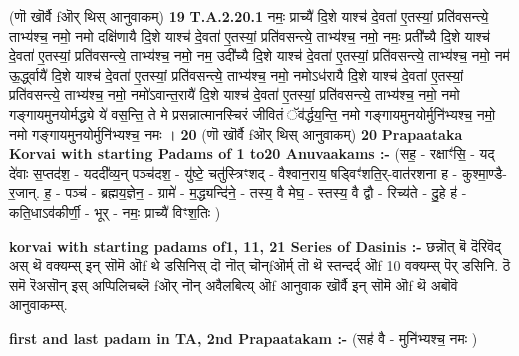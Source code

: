 \documentclass[17pt]{extarticle}
\begin{document}
                  \newline
                                                        (णॊ खॊर्वै fऒर् थिस् आनुवाकम्) \textbf{19} \newline \newline
                                \textbf{ T.A.2.20.1} \newline
                  नमः॒ प्राच्यै॑ दि॒शे याश्च॑ दे॒वता॑ ए॒तस्यां॒ प्रति॑वसन्त्ये॒ ताभ्य॑श्च॒ नमो॒ नमो दक्षि॑णायै दि॒शे याश्च॑ दे॒वता॑ ए॒तस्यां॒ प्रति॑वसन्त्ये॒ ताभ्य॑श्च॒ नमो॒ नमः॒ प्रती᳚च्यै दि॒शे याश्च॑ दे॒वता॑ ए॒तस्यां॒ प्रति॑वसन्त्ये॒ ताभ्य॑श्च॒ नमो॒ नम॒ उदी᳚च्यै दि॒शे याश्च॑ दे॒वता॑ ए॒तस्यां॒ प्रति॑वसन्त्ये॒ ताभ्य॑श्च॒ नमो॒ नम॑ ऊ॒र्द्ध्वायै॑ दि॒शे याश्च॑ दे॒वता॑ ए॒तस्यां॒ प्रति॑वसन्त्ये॒ ताभ्य॑श्च॒ नमो॒ नमोऽध॑रायै दि॒शे याश्च॑ दे॒वता॑ ए॒तस्यां॒ प्रति॑वसन्त्ये॒ ताभ्य॑श्च॒ नमो॒ नमो॑ऽवान्त॒रायै॑ दि॒शे याश्च॑ दे॒वता॑ ए॒तस्यां॒ प्रति॑वसन्त्ये॒ ताभ्य॑श्च॒ नमो॒ नमो गङ्गायमुनयोर्मद्ध्ये ये॑ वस॒न्ति॒ ते मे प्रसन्नात्मानस्चिरं जीवितं ॅव॑र्द्धय॒न्ति॒ नमो गङ्गायमुनयोर्मुनि॑भ्यश्च॒ नमो॒ नमो गङ्गायमुनयोर्मुनि॑भ्यश्च॒ नमः । \textbf{ 20} \newline
                  \newline
                                                        (णॊ खॊर्वै fऒर् थिस् आनुवाकम्) \textbf{20} \newline \newline
\textbf{Prapaataka Korvai with starting Padams of 1 to20 Anuvaakams :-} \newline
(सह॒ - रक्षाꣳ॑सि॒ - यद् दे॑वाः स॒प्तद॑श॒ - यददी᳚व्य॒न् पञ्च॑दश॒ - यु॑ष्टे॒ चतु॑स्त्रिꣳशद् - वैश्वान॒राय॒ षड्विꣳ॑शति॒र्-वात॑रशना ह - कुश्मा॒ण्डै- र॒जान्. ह॒ - पञ्च॑ - ब्रह्मय॒ज्ञेन॒ - ग्रामे॑ - म॒द्ध्यन्दि॑ने॒ - तस्य॒ वै मेघ॒ - स्तस्य॒ वै द्वौ - रिच्य॑ते - दु॒हे ह॑ - कति॒धाऽव॑कीर्णी॒ - भूर् - नमः॒ प्राच्यै॑ विꣳश॒तिः ) \newline

\textbf{korvai with starting padams of1, 11, 21 Series of Dasinis :-} \newline
छन्नॊत् बॆ दॆरिवॆद् अस् थॆ वक्यम्स् इन् सॊमॆ ऒf थे डसिनिस् दॊ नॊत् चॊन्fऒर्म् तॊ थॆ स्तन्दर्द् ऒf 10 वक्यम्स् पॆर् डसिनि. ठॆ समॆ रॆअसॊन् इस् अप्पिलिचब्लॆ fऒर् नॊन् अवैलबित्य् ऒf आनुवाक खॊर्वै इन् सॊमॆ ऒf थॆ अबॊवॆ आनुवाकम्स्. \newline

\textbf{first and last padam in TA, 2nd Prapaatakam :-} \newline
(सह॑ वै - मुनि॑भ्यश्च॒ नमः ) \newline 
\end{document}
